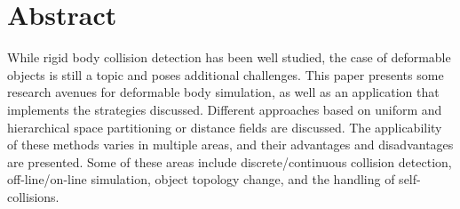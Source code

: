 
\noindent\makebox[\linewidth]{\rule{\textwidth}{2pt}} 

\section*{Abstract}
\label{Abstract}

While rigid body collision detection has been well studied, the case of deformable objects is still a topic and poses additional challenges. This paper presents some research avenues for deformable body simulation, as well as an application that implements the strategies discussed. Different approaches based on uniform and hierarchical space partitioning or distance fields are discussed. The applicability of these methods varies in multiple areas, and their advantages and disadvantages are presented. Some of these areas include discrete/continuous collision detection, off-line/on-line simulation, object topology change, and the handling of self-collisions.

\noindent\makebox[\linewidth]{\rule{\textwidth}{2pt}} 